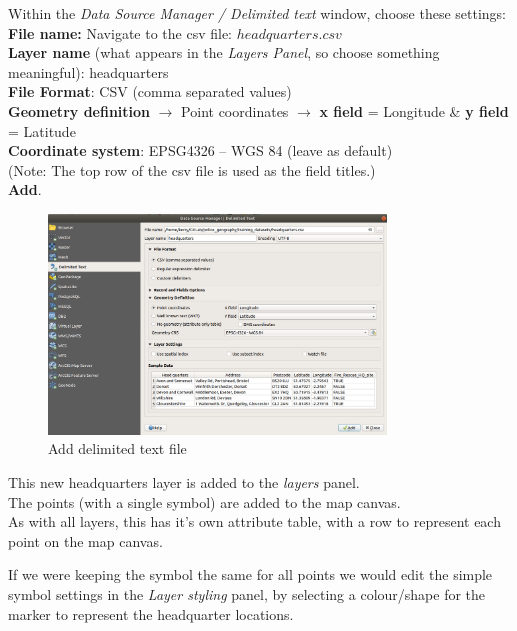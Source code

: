 Within the \textit{Data Source Manager / Delimited text} window, choose these settings:\\
\textbf{File name:} Navigate to the csv file: $headquarters.csv$\\
\textbf{Layer name} (what appears in the \textit{Layers Panel}, so choose something meaningful): headquarters\\
\textbf{File Format}: CSV (comma separated values)\\
\textbf{Geometry definition} $\rightarrow$ Point coordinates $\rightarrow$  
\textbf{x field} = Longitude \& \textbf{y field} = Latitude\\
\textbf{Coordinate system}: EPSG4326 – WGS 84 (leave as default)\\
(Note: The top row of the csv file is used as the field titles.)\\
\textbf{Add}.\\

\begin{figure}[!h]
	\centering
	\includegraphics[width=0.8\textwidth]{images/data_source_manager_add_delimited_text.png}
	\caption{Add delimited text file}
	\label{ft_fig_firstfig3}
\end{figure}
\newpage
This new headquarters layer is added to the \emph{layers} panel.\\
The points (with a single symbol) are added to the map canvas.\\
As with all layers, this has it's own attribute table, with a row to represent each point on the map canvas.

If we were keeping the symbol the same for all points we would edit the simple symbol settings in the \emph{Layer styling} panel, by selecting a colour/shape  for the marker to represent the headquarter locations.

